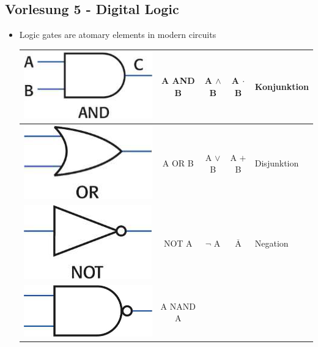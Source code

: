 \subsection*{Vorlesung 5 - Digital Logic}
 \begin{itemize}
  \item Logic gates are atomary elements in modern circuits \\
   \begin{tabular}{|lcccl|}
    \hline \includegraphics[scale=0.6]{logic-and.png}  & A AND B & A $\land$ B & A $\cdot$ B & Konjunktion \\
    \hline \includegraphics[scale=0.6]{logic-or.png}& A OR B  & A $\lor$ B  & A $+$ B & Disjunktion \\
    \hline \includegraphics[scale=0.6]{logic-not.png}& NOT A   & $\neg$ A    & $\overline{\text{A}}$ & Negation \\
    \hline \includegraphics[scale=0.2]{logic-nand.png}& A NAND A   &    & \\
           \hline
   \end{tabular}\\

\end{itemize}
